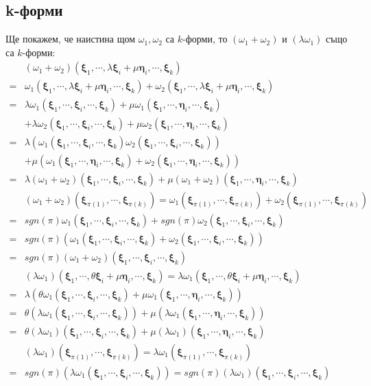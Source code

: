 \documentclass[12pt]{article}
\newcommand\myxi[0]{\boldsymbol{\xi}}
\newcommand\myeta[0]{\boldsymbol{\eta}}
\begin{document}
\begin{large}
  \subsection{k-форми}
  Ще покажем, че наистина щом $\omega_1, \omega_2$ са $k$-форми, то $(\omega_1+\omega_2)$ и $(\lambda\omega_1)$ също са $k$-форми:
  \begin{align*}
    &(\omega_1+\omega_2)(\myxi_1,\cdots,\lambda\myxi_i+\mu\myeta_i,\cdots,\myxi_k) \\
    =&\omega_1(\myxi_1,\cdots,\lambda\myxi_i+\mu\myeta_i,\cdots,\myxi_k)+\omega_2(\myxi_1,\cdots,\lambda\myxi_i+\mu\myeta_i,\cdots,\myxi_k) \\
    =&\lambda\omega_1(\myxi_1,\cdots,\myxi_i,\cdots,\myxi_k)+\mu\omega_1(\myxi_1,\cdots,\myeta_i,\cdots,\myxi_k)\\
    &+\lambda\omega_2(\myxi_1,\cdots,\myxi_i,\cdots,\myxi_k)+\mu\omega_2(\myxi_1,\cdots,\myeta_i,\cdots,\myxi_k) \\
    =&\lambda(\omega_1(\myxi_1,\cdots,\myxi_i,\cdots,\myxi_k)\omega_2(\myxi_1,\cdots,\myxi_i,\cdots,\myxi_k))\\
    &+\mu(\omega_1(\myxi_1,\cdots,\myeta_i,\cdots,\myxi_k)+\omega_2(\myxi_1,\cdots,\myeta_i,\cdots,\myxi_k)) \\
    =&\lambda (\omega_1+\omega_2)(\myxi_1,\cdots,\myxi_i,\cdots,\myxi_k) + \mu (\omega_1+\omega_2)(\myxi_1,\cdots,\myeta_i,\cdots,\myxi_k) \\
    &(\omega_1+\omega_2)(\myxi_{\pi(1)},\cdots,\myxi_{\pi(k)})=\omega_1(\myxi_{\pi(1)},\cdots,\myxi_{\pi(k)})+\omega_2(\myxi_{\pi(1)},\cdots,\myxi_{\pi(k)}) \\
    =&sgn(\pi)\omega_1(\myxi_1,\cdots,\myxi_i,\cdots,\myxi_k)+sgn(\pi)\omega_2(\myxi_1,\cdots,\myxi_i,\cdots,\myxi_k) \\
    =&sgn(\pi)(\omega_1(\myxi_1,\cdots,\myxi_i,\cdots,\myxi_k)+\omega_2(\myxi_1,\cdots,\myxi_i,\cdots,\myxi_k))\\
    =&sgn(\pi)(\omega_1+\omega_2)(\myxi_1,\cdots,\myxi_i,\cdots,\myxi_k) \\
    &(\lambda\omega_1)(\myxi_1,\cdots,\theta\myxi_i+\mu\myeta_i,\cdots,\myxi_k)=\lambda\omega_1(\myxi_1,\cdots,\theta\myxi_i+\mu\myeta_i,\cdots,\myxi_k) \\
    =&\lambda(\theta\omega_1(\myxi_1,\cdots,\myxi_i,\cdots,\myxi_k)+\mu\omega_1(\myxi_1,\cdots,\myeta_i,\cdots,\myxi_k)) \\
    =&\theta(\lambda\omega_1(\myxi_1,\cdots,\myxi_i,\cdots,\myxi_k))+\mu(\lambda\omega_1(\myxi_1,\cdots,\myeta_i,\cdots,\myxi_k)) \\
    =&\theta(\lambda\omega_1)(\myxi_1,\cdots,\myxi_i,\cdots,\myxi_k)+\mu(\lambda\omega_1)(\myxi_1,\cdots,\myeta_i,\cdots,\myxi_k) \\
    &(\lambda\omega_1)(\myxi_{\pi(1)},\cdots,\myxi_{\pi(k)})=\lambda\omega_1(\myxi_{\pi(1)},\cdots,\myxi_{\pi(k)}) \\
    =&sgn(\pi)(\lambda\omega_1 (\myxi_1,\cdots,\myxi_i,\cdots,\myxi_k))=sgn(\pi)(\lambda\omega_1)(\myxi_1,\cdots,\myxi_i,\cdots,\myxi_k) \\
  \end{align*}


\end{large}
\end{document}
